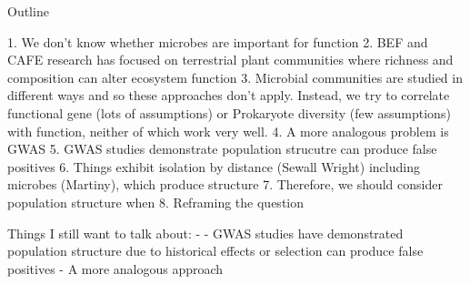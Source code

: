 Outline

1. We don't know whether microbes are important for function
2. BEF and CAFE research has focused on terrestrial plant communities where
richness and composition can alter ecosystem function
3. Microbial communities are studied in different ways and so these approaches
don't apply. Instead, we try to correlate functional gene (lots of assumptions)
or Prokaryote diversity (few assumptions) with function, neither of which work
very well.
4. A more analogous problem is GWAS
5. GWAS studies demonstrate population strucutre can produce false positives
6. Things exhibit isolation by distance (Sewall Wright) including microbes
(Martiny), which produce structure
7. Therefore, we should consider population structure when 
8. Reframing the question

Things I still want to talk about:
- 
- GWAS studies have demonstrated population structure due to historical effects
or selection can produce false positives 
- A more analogous approach



